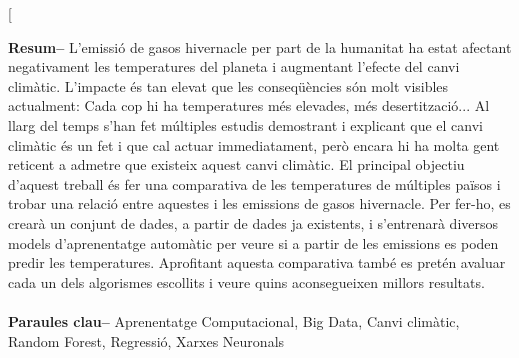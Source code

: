 \documentclass[10pt,a4paper,twocolumn,twoside]{article}
\begin{document}
\twocolumn[\begin{@twocolumnfalse}


\maketitle

\thispagestyle{primerapagina}
\begin{center}
\parbox{0.915\textwidth}
{\sffamily
\textbf{Resum--}
L'emissió de gasos hivernacle per part de la humanitat ha estat afectant negativament les temperatures del planeta i augmentant l'efecte del canvi climàtic. L'impacte és tan elevat que les conseqüències són molt visibles actualment: Cada cop hi ha temperatures més elevades, més desertització... Al llarg del temps s'han fet múltiples estudis demostrant i explicant que el canvi climàtic és un fet i que cal actuar immediatament, però encara hi ha molta gent reticent a admetre que existeix aquest canvi climàtic. El principal objectiu d'aquest treball és fer una comparativa de les temperatures de múltiples països i trobar una relació entre aquestes i les emissions de gasos hivernacle. Per fer-ho, es crearà un conjunt de dades, a partir de dades ja existents, i s'entrenarà diversos models d'aprenentatge automàtic per veure si a partir de les emissions es poden predir les temperatures. Aprofitant aquesta comparativa també es pretén avaluar cada un dels algorismes escollits i veure quins aconsegueixen millors resultats.
\\
\\
\textbf{Paraules clau-- } Aprenentatge Computacional, Big Data, Canvi climàtic, Random Forest,  Regressió, Xarxes Neuronals \\
\\
\bigskip
\\
}
\end{center}
\end{@twocolumnfalse}
\end{document}
